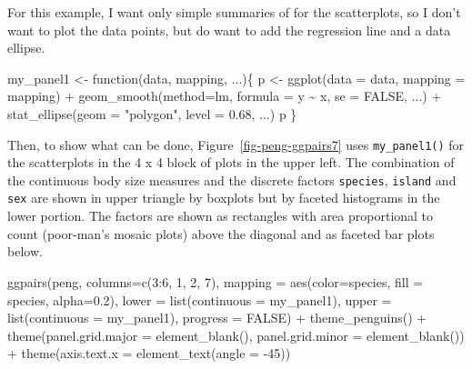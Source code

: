 \documentclass[
  letterpaper,
  10pt,
  krantz2]{krantz}
\makeatletter
\newenvironment{Shaded}{\begin{snugshade}}{\end{snugshade}}
\newcommand{\AttributeTok}[1]{\textcolor[rgb]{0.40,0.45,0.13}{#1}}
\newcommand{\ConstantTok}[1]{\textcolor[rgb]{0.56,0.35,0.01}{#1}}
\newcommand{\ControlFlowTok}[1]{\textcolor[rgb]{0.00,0.23,0.31}{#1}}
\newcommand{\DecValTok}[1]{\textcolor[rgb]{0.68,0.00,0.00}{#1}}
\newcommand{\FloatTok}[1]{\textcolor[rgb]{0.68,0.00,0.00}{#1}}
\newcommand{\FunctionTok}[1]{\textcolor[rgb]{0.28,0.35,0.67}{#1}}
\newcommand{\NormalTok}[1]{\textcolor[rgb]{0.00,0.23,0.31}{#1}}
\newcommand{\OtherTok}[1]{\textcolor[rgb]{0.00,0.23,0.31}{#1}}
\newcommand{\SpecialCharTok}[1]{\textcolor[rgb]{0.37,0.37,0.37}{#1}}
\newcommand{\StringTok}[1]{\textcolor[rgb]{0.13,0.47,0.30}{#1}}
\newenvironment{kframe}{%
  \medskip{}
  \setlength{\fboxsep}{.8em}
  \def\at@end@of@kframe{}%
  \ifinner\ifhmode%
  \def\at@end@of@kframe{\end{minipage}}%
  \begin{minipage}{\columnwidth}%
  \fi\fi%
  \def\FrameCommand##1{\hskip\@totalleftmargin \hskip-\fboxsep
  \colorbox{shadecolor}{##1}\hskip-\fboxsep
      \hskip-\linewidth \hskip-\@totalleftmargin \hskip\columnwidth}%
  \MakeFramed {\advance\hsize-\width
    \@totalleftmargin\z@ \linewidth\hsize
    \@setminipage}}%
{\par\unskip\endMakeFramed%
  \at@end@of@kframe}
\renewenvironment{Shaded}{\begin{kframe}}{\end{kframe}}
\makeatother
\begin{document}
For this example, I want only simple summaries of for the scatterplots,
so I don't want to plot the data points, but do want to add the
regression line and a data ellipse.

\begin{Shaded}
\begin{Highlighting}[]
\NormalTok{my\_panel1 }\OtherTok{\textless{}{-}} \ControlFlowTok{function}\NormalTok{(data, mapping, ...)\{}
\NormalTok{  p }\OtherTok{\textless{}{-}} \FunctionTok{ggplot}\NormalTok{(}\AttributeTok{data =}\NormalTok{ data, }\AttributeTok{mapping =}\NormalTok{ mapping) }\SpecialCharTok{+} 
     \FunctionTok{geom\_smooth}\NormalTok{(}\AttributeTok{method=}\NormalTok{lm, }\AttributeTok{formula =}\NormalTok{ y }\SpecialCharTok{\textasciitilde{}}\NormalTok{ x, }\AttributeTok{se =} \ConstantTok{FALSE}\NormalTok{, ...) }\SpecialCharTok{+}
     \FunctionTok{stat\_ellipse}\NormalTok{(}\AttributeTok{geom =} \StringTok{"polygon"}\NormalTok{, }\AttributeTok{level =} \FloatTok{0.68}\NormalTok{, ...)}
\NormalTok{  p}
\NormalTok{\}}
\end{Highlighting}
\end{Shaded}

Then, to show what can be done, Figure~\ref{fig-peng-ggpairs7} uses
\texttt{my\_panel1()} for the scatterplots in the 4 x 4 block of plots
in the upper left. The combination of the continuous body size measures
and the discrete factors \texttt{species}, \texttt{island} and
\texttt{sex} are shown in upper triangle by boxplots but by faceted
histograms in the lower portion. The factors are shown as rectangles
with area proportional to count (poor-man's mosaic plots) above the
diagonal and as faceted bar plots below.

\begin{Shaded}
\begin{Highlighting}[]
\FunctionTok{ggpairs}\NormalTok{(peng, }\AttributeTok{columns=}\FunctionTok{c}\NormalTok{(}\DecValTok{3}\SpecialCharTok{:}\DecValTok{6}\NormalTok{, }\DecValTok{1}\NormalTok{, }\DecValTok{2}\NormalTok{, }\DecValTok{7}\NormalTok{),}
        \AttributeTok{mapping =} \FunctionTok{aes}\NormalTok{(}\AttributeTok{color=}\NormalTok{species, }\AttributeTok{fill =}\NormalTok{ species, }\AttributeTok{alpha=}\FloatTok{0.2}\NormalTok{),}
        \AttributeTok{lower =} \FunctionTok{list}\NormalTok{(}\AttributeTok{continuous =}\NormalTok{ my\_panel1),}
        \AttributeTok{upper =} \FunctionTok{list}\NormalTok{(}\AttributeTok{continuous =}\NormalTok{ my\_panel1),}
        \AttributeTok{progress =} \ConstantTok{FALSE}\NormalTok{) }\SpecialCharTok{+}
  \FunctionTok{theme\_penguins}\NormalTok{() }\SpecialCharTok{+}
  \FunctionTok{theme}\NormalTok{(}\AttributeTok{panel.grid.major =} \FunctionTok{element\_blank}\NormalTok{(), }
        \AttributeTok{panel.grid.minor =} \FunctionTok{element\_blank}\NormalTok{()) }\SpecialCharTok{+} 
  \FunctionTok{theme}\NormalTok{(}\AttributeTok{axis.text.x =} \FunctionTok{element\_text}\NormalTok{(}\AttributeTok{angle =} \SpecialCharTok{{-}}\DecValTok{45}\NormalTok{))}
\end{Highlighting}
\end{Shaded}
\end{document}
